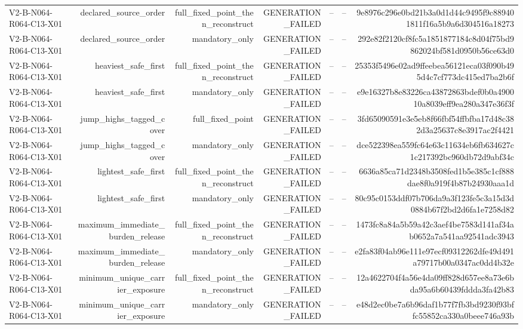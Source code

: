 {\begin{longtable}{lrrrrrr}
V2-B-N064-R064-C13-X01 & declared\_source\_order & full\_fixed\_point\_then\_reconstruct & GENERATION\_FAILED & -- & -- & 9e8976c296e0bd21b3a0d1d44c9495f9c889401811f16a5b9a6d304516a18273 \\
V2-B-N064-R064-C13-X01 & declared\_source\_order & mandatory\_only & GENERATION\_FAILED & -- & -- & 292e82f2120cf8fc5a1851877184c8d04f75bd9862024bf581d0950b56ce63d0 \\
V2-B-N064-R064-C13-X01 & heaviest\_safe\_first & full\_fixed\_point\_then\_reconstruct & GENERATION\_FAILED & -- & -- & 25353f5496e02ad9ffeebea56121eca03f090b495d4c7cf773dc415ed7ba2b6f \\
V2-B-N064-R064-C13-X01 & heaviest\_safe\_first & mandatory\_only & GENERATION\_FAILED & -- & -- & e9e16327b8e83226ca43872863bdef0b0a490010a8039eff9ea280a347e36f3f \\
V2-B-N064-R064-C13-X01 & jump\_highs\_tagged\_cover & full\_fixed\_point & GENERATION\_FAILED & -- & -- & 3fd65090591e3e5eb8f66fbf54ffbfba17d48c382d3a25637c8e3917ac2f4421 \\
V2-B-N064-R064-C13-X01 & jump\_highs\_tagged\_cover & mandatory\_only & GENERATION\_FAILED & -- & -- & dce522398ea559fc64e63c11634eb6fb634627c1c217392bc960db72d9abf34c \\
V2-B-N064-R064-C13-X01 & lightest\_safe\_first & full\_fixed\_point\_then\_reconstruct & GENERATION\_FAILED & -- & -- & 6636a85ca71d2348b3508fed1b5e385c1cf888dae8f0a919f4b87b24930aaa1d \\
V2-B-N064-R064-C13-X01 & lightest\_safe\_first & mandatory\_only & GENERATION\_FAILED & -- & -- & 80c95c0153ddf07b706da9a3f123fe5c3a15d3d0884b67f2bd2d6fa1e7258d82 \\
V2-B-N064-R064-C13-X01 & maximum\_immediate\_burden\_release & full\_fixed\_point\_then\_reconstruct & GENERATION\_FAILED & -- & -- & 1473fc8a84a5b59a42c3aef4be7583d141af34ab0652a7a541aa92541adc3943 \\
V2-B-N064-R064-C13-X01 & maximum\_immediate\_burden\_release & mandatory\_only & GENERATION\_FAILED & -- & -- & e2fa83f04ab96e111e97ecf09312262dfe49d491a79717b00a0347ac0dd4b32e \\
V2-B-N064-R064-C13-X01 & minimum\_unique\_carrier\_exposure & full\_fixed\_point\_then\_reconstruct & GENERATION\_FAILED & -- & -- & 12a4622704f4a56e4da09ff828d657ee8a73e6bda95a6b60439fddda3fa42b83 \\
V2-B-N064-R064-C13-X01 & minimum\_unique\_carrier\_exposure & mandatory\_only & GENERATION\_FAILED & -- & -- & e48d2ec0be7a6b96daf1b77f7fb3bd9230f93bffc55852ca330a0beee746a93b \\

\end{longtable}}
